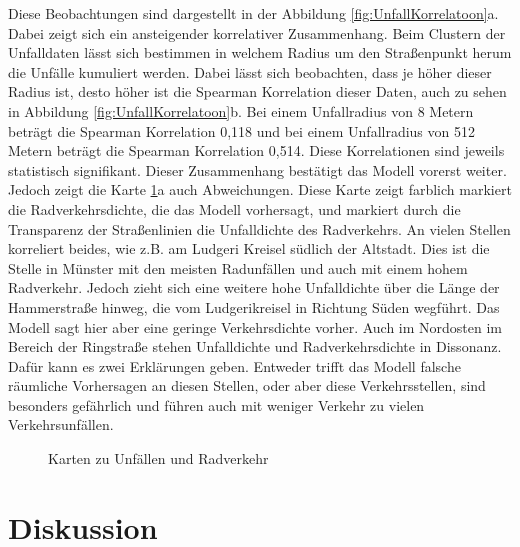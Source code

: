 \documentclass[a4paper,12pt]{thesis}
\begin{document}
Diese Beobachtungen sind dargestellt in der Abbildung \ref{fig:UnfallKorrelatoon}a. Dabei zeigt sich ein ansteigender korrelativer Zusammenhang. Beim Clustern der Unfalldaten lässt sich bestimmen in welchem Radius um den Straßenpunkt herum die Unfälle kumuliert werden. Dabei lässt sich beobachten, dass je höher dieser Radius ist, desto höher ist die Spearman Korrelation dieser Daten, auch zu sehen in Abbildung \ref{fig:UnfallKorrelatoon}b. Bei einem Unfallradius von 8 Metern beträgt die Spearman Korrelation 0,118 und bei einem Unfallradius von 512 Metern beträgt die Spearman Korrelation 0,514. Diese Korrelationen sind jeweils statistisch signifikant. Dieser Zusammenhang bestätigt das Modell vorerst weiter.\\

Jedoch zeigt die Karte \ref{fig:Unfallkarten}a auch Abweichungen. Diese Karte zeigt farblich markiert die Radverkehrsdichte, die das Modell vorhersagt, und markiert durch die Transparenz der Straßenlinien die Unfalldichte des Radverkehrs. An vielen Stellen korreliert beides, wie z.B. am Ludgeri Kreisel südlich der Altstadt. Dies ist die Stelle in Münster mit den meisten Radunfällen und auch mit einem hohem Radverkehr. Jedoch zieht sich eine weitere hohe Unfalldichte über die Länge der Hammerstraße hinweg, die vom Ludgerikreisel in Richtung Süden wegführt. Das Modell sagt hier aber eine geringe Verkehrsdichte vorher. Auch im Nordosten im Bereich der Ringstraße stehen Unfalldichte und Radverkehrsdichte in Dissonanz. Dafür kann es zwei Erklärungen geben. Entweder trifft das Modell falsche räumliche Vorhersagen an diesen Stellen, oder aber diese Verkehrsstellen, sind besonders gefährlich und führen auch mit weniger Verkehr zu vielen Verkehrsunfällen.

\begin{figure}%
	\centering
	
	\caption{Karten zu Unfällen und Radverkehr}%
	\label{fig:Unfallkarten}%
\end{figure}

\chapter{Diskussion}
\end{document}
